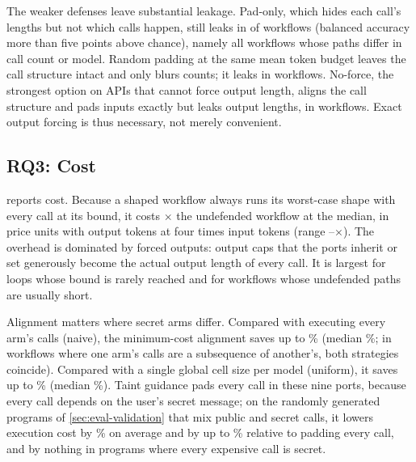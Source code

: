 The weaker defenses leave substantial leakage. Pad-only, which hides each call's lengths but not which calls happen, still leaks in \resPadonlyLeaky{} of \resWorkflows{} workflows (balanced accuracy more than five points above chance), namely all workflows whose paths differ in call count or model. Random padding at the same mean token budget leaves the call structure intact and only blurs counts; it leaks in \resRandpadLeaky{} workflows. No-force, the strongest option on APIs that cannot force output length, aligns the call structure and pads inputs exactly but leaks output lengths, in \resNoforceLeaky{} workflows. Exact output forcing is thus necessary, not merely convenient.

\subsection{RQ3: Cost}\label{sec:eval-overhead}

 reports cost. Because a shaped workflow always runs its worst-case shape with every call at its bound, it costs \resOverheadMedian$\times$ the undefended workflow at the median, in price units with output tokens at four times input tokens (range \resOverheadMin--\resOverheadMax$\times$). The overhead is dominated by forced outputs: output caps that the ports inherit or set generously become the actual output length of every call. It is largest for loops whose bound is rarely reached and for workflows whose undefended paths are usually short.

Alignment matters where secret arms differ. Compared with executing every arm's calls (naive), the minimum-cost alignment saves up to \resNaiveSavingMax\% (median \resNaiveSavingMedian\%; in workflows where one arm's calls are a subsequence of another's, both strategies coincide). Compared with a single global cell size per model (uniform), it saves up to \resUniformSavingMax\% (median \resUniformSavingMedian\%). Taint guidance pads every call in these nine ports, because every call depends on the user's secret message; on the \diffMixedPrograms{} randomly generated programs of \cref{sec:eval-validation} that mix public and secret calls, it lowers execution cost by \diffTaintSavingMean\% on average and by up to \diffTaintSavingMax\% relative to padding every call, and by nothing in programs where every expensive call is secret.

